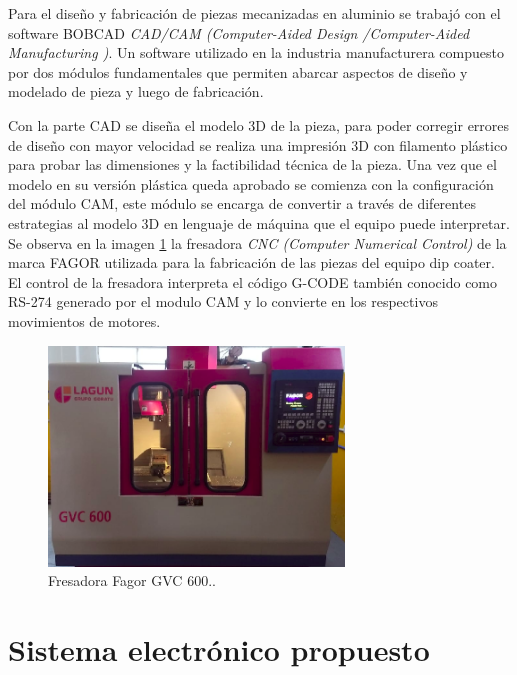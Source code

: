 Para el diseño y fabricación de piezas mecanizadas en aluminio se trabajó con el software BOBCAD \citep{web_bobcad} \textit{CAD/CAM (Computer-Aided Design /Computer-Aided Manufacturing )}. Un software  utilizado en la industria manufacturera compuesto por dos módulos fundamentales que permiten abarcar aspectos de diseño y modelado de pieza y luego de fabricación.  

Con la parte CAD se diseña el modelo 3D de la pieza, para poder corregir errores de diseño con mayor velocidad se realiza una impresión 3D con filamento plástico para probar las dimensiones y la factibilidad técnica de la pieza.
Una vez que el modelo en su versión plástica queda aprobado se comienza con la configuración del módulo CAM, este módulo se encarga de convertir a través de diferentes estrategias al modelo 3D en lenguaje de máquina que el equipo puede interpretar. Se observa en la imagen \ref{fig:fagor} la fresadora \textit{ CNC (Computer Numerical Control)} de la marca FAGOR \citep{web_fagor} utilizada para la fabricación de las piezas del equipo dip coater. El control de la fresadora interpreta el código G-CODE también conocido como RS-274 \citep{web_gcode} generado por el modulo CAM y lo convierte en los respectivos movimientos de motores.


\begin{figure}[ht]
\centering 
\includegraphics[width=0.7\textwidth]{./Figures/fagor.png}
\caption{Fresadora Fagor GVC 600.\protect\footnotemark.}
\label{fig:fagor}
\end{figure}
 

\section{Sistema electrónico propuesto}


